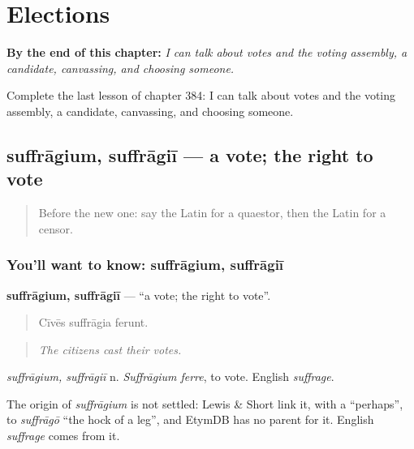 
\chapter{Elections}
\label{ch:la-elections}

\begin{chapteropening}
\textbf{By the end of this chapter:} \emph{I can talk about votes and the voting assembly, a candidate, canvassing, and choosing someone.}

Complete the last lesson of chapter 384: I can talk about votes and the voting assembly, a candidate, canvassing, and choosing someone.
\end{chapteropening}

\section[suffrāgium, suffrāgiī]{suffrāgium, suffrāgiī — a vote; the right to vote}

\label{lesson:LA-C384-suffragium}



\begin{quote}
Before the new one: say the Latin for a quaestor, then the Latin for a censor.
\end{quote}

\subsection*{You'll want to know: suffrāgium, suffrāgiī}
\textbf{suffrāgium, suffrāgiī} — \textquotedblleft{}a vote; the right to vote\textquotedblright{}.

\begin{quote}
Cīvēs suffrāgia ferunt.
\end{quote}

\begin{quote}
\emph{The citizens cast their votes.}
\end{quote}

\emph{suffrāgium, suffrāgiī} n. \emph{Suffrāgium ferre}, to vote. English \emph{suffrage}.

\begin{cousinweb}
The origin of \emph{suffrāgium} is not settled: Lewis \& Short link it, with a \textquotedblleft{}perhaps\textquotedblright{}, to \emph{suffrāgō} \textquotedblleft{}the hock of a leg\textquotedblright{}, and EtymDB has no parent for it. English \emph{suffrage} comes from it.
\end{cousinweb}

